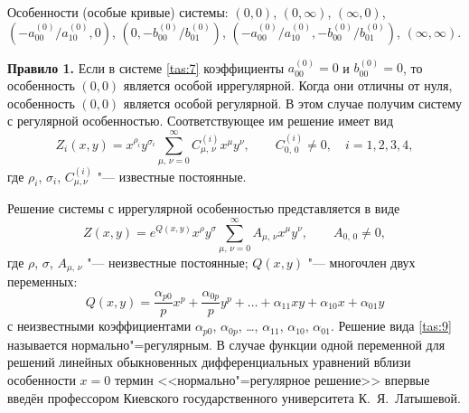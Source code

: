 Особенности (особые кривые) системы: $(0, 0)$, $(0, \infty)$, $(\infty, 0)$,
$(-a_{00}^{(0)}/a_{10}^{(0)}, 0)$,
$(0, -b_{00}^{(0)}/b_{01}^{(0)})$,
$(-a_{00}^{(0)}/a_{10}^{(0)}, -b_{00}^{(0)}/b_{01}^{(0)})$,
$(\infty, \infty)$.

\smallskip

{\bf Правило 1.} Если в системе \eqref{tas:7} коэффициенты
$a_{00}^{(0)}=0$ и $b_{00}^{(0)}=0$, то особенность $(0, 0)$
является особой иррегулярной.
Когда они отличны от нуля, особенность $(0, 0)$ является особой регулярной. 
В этом случае получим систему с регулярной особенностью. 
Соответствующее им решение имеет вид
\begin{equation}
Z_{i}(x,y)=x^{\rho_{i}}   y^{\sigma_{i}}    \displaystyle
\sum_{\mu,\,\nu=0}^\infty C_{\mu,\,\nu}^{(i)}   x^{\mu}  
y^{\nu}, \qquad C_{0,\,0}^{(i)}\neq 0, \quad i=1, 2, 3, 4,
\label{tas:8}
\end{equation}
где
$\rho_{i}$, $\sigma_{i}$, 
$C_{\mu, \nu}^{(i)}$ "--- известные постоянные.

Решение системы с иррегулярной особенностью представляется в виде
\begin{equation}
Z(x,y)=e^{Q(x,y)}   x^{\rho}   y^{\sigma}   
\displaystyle \sum_{\mu,\,\nu=0}^\infty A_{\mu,\,\nu}  
x^{\mu}   y^{\nu}, \qquad A_{0,\,0}\neq 0,
\label{tas:9}
\end{equation}
где
$\rho$, $\sigma$, $A_{\mu,\,\nu}$ "---
неизвестные постоянные; $Q(x,y)$ "--- многочлен двух переменных:
\begin{equation}
Q(x,y)=\frac{\alpha_{p0}}{p}   x^{p}+\frac{\alpha_{0p}}{p}  
y^{p}+\dots+\alpha_{11}   xy+\alpha_{10}   x+\alpha_{01}  
y
\label{tas:10}
\end{equation}
с неизвестными коэффициентами $\alpha_{p0}$, $\alpha_{0p}$, \dots,
$\alpha_{11}$, $\alpha_{10}$, $\alpha_{01}$. Решение вида \eqref{tas:9}
называется нормально"=регулярным. В случае функции одной переменной
для решений линейных обыкновенных дифференциальных уравнений
вблизи особенности $x=0$ термин <<нормально"=регулярное решение>>
впервые введён профессором Киевского государственного университета К.~Я.~Латышевой.

\smallskip


